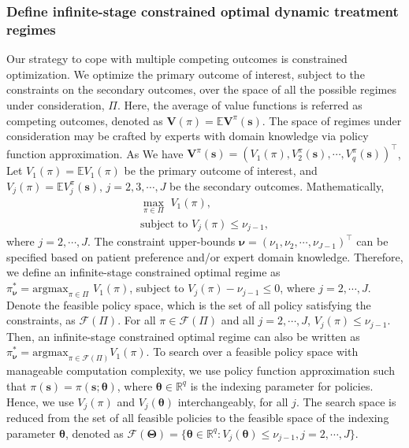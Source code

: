\documentclass{article}
\newcommand{\bs}{ \boldsymbol}
\newcommand{\mb}{\mathbb}
\newcommand{\ml}{\mathcal}
\newcommand{\lt}{\left}
\newcommand{\rt}{\right}
\begin{document}
\subsubsection*{Define infinite-stage constrained optimal dynamic treatment regimes}
Our strategy to cope with multiple competing outcomes is constrained optimization.  We optimize the primary outcome of interest, subject to the constraints on the secondary outcomes, over the space of all the possible regimes under consideration, $\Pi$. Here, the average of value functions is referred as competing outcomes, denoted as $\bs{V}(\pi) =\mb{E}\bs{V}^{\pi}(\bs{s}) $. The space of regimes under consideration may be crafted by experts with domain knowledge via policy function approximation. As We have $\bs{V}^{\pi}(\bs{s}) = \lt( V_1({\pi}), V^{\pi}_2(\bs{s}), \cdots, V^{\pi}_q(\bs{s})\rt)^\intercal$, Let $V_1(\pi) = \mb{E} V_1({\pi})$ be the primary outcome of interest, and $V_j(\pi) = \mb{E}V^{\pi}_j(\bs{s}), \, j = 2, 3, \cdots, J$ be the secondary outcomes. Mathematically, 
\begin{equation}
\begin{gathered}
\max_{\pi \in \Pi}  \,\, V_1(\pi), \\ 
\text{subject to}  \,\, V_j(\pi) \le \nu_{j-1},
\end{gathered}
\end{equation}
where $j = 2, \cdots, J$. The constraint upper-bounds $\bs{\nu} = (\nu_1, \nu_2, \cdots, \nu_{J-1})^\intercal$ can be specified based on patient preference and/or expert domain knowledge. Therefore, we define an infinite-stage  constrained optimal regime as $\pi^*_{\bs{\nu}} = \text{argmax}_{\pi \in \Pi} \,\, V_1({\pi})$, subject to $V_j(\pi) - \nu_{j-1} \le 0$, where $j = 2, \cdots, J$. Denote the feasible policy space, which is the set of all policy satisfying the constraints, as $\ml{F}(\Pi)$. For all $\pi \in \ml{F}(\Pi)$ and all $j = 2, \cdots, J$, $V_j({\pi}) \le \nu_{j-1}$. Then, an infinite-stage constrained optimal regime can also be written as $\pi^*_{\bs{\nu}} = \text{argmax}_{\pi \in \ml{F}(\Pi)}  V_1({\pi})$. To search over a feasible policy space with manageable computation complexity, we use policy function approximation such that $\pi(\bs{s})  = \pi(\bs{s}; \bs{\theta})$, where $\bs{\theta} \in \mb{R}^q$ is the indexing parameter for policies. Hence, we use $V_j(\pi)$ and $V_j(\bs{\theta})$ interchangeably, for all $j$. The search space is reduced from the set of all feasible policies to the feasible space of the indexing parameter $\bs{\theta} $, denoted as $\ml{F}(\bs{\Theta}) = \{ \bs{\theta} \in \mb{R}^q :  V_j(\bs{\theta}) \le \nu_{j-1},  j = 2, \cdots, J\}$.  \\
\end{document}
